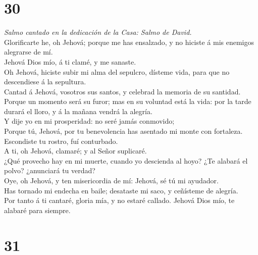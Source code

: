 \hypertarget{section-29}{%
\section{30}\label{section-29}}

 \emph{Salmo cantado en la dedicación de la Casa: Salmo de
David.}\\
Glorificarte he, oh Jehová; porque me has ensalzado, y no hiciste á mis
enemigos alegrarse de mí.\\
 Jehová Dios mío, á ti clamé, y me sanaste.\\
 Oh Jehová, hiciste subir mi alma del sepulcro, dísteme
vida, para que no descendiese á la sepultura.\\
 Cantad á Jehová, vosotros sus santos, y celebrad la memoria
de su santidad.\\
 Porque un momento será su furor; mas en su voluntad está la
vida: por la tarde durará el lloro, y á la mañana vendrá la alegría.\\
 Y dije yo en mi prosperidad: no seré jamás conmovido;\\
 Porque tú, Jehová, por tu benevolencia has asentado mi
monte con fortaleza. Escondiste tu rostro, fuí conturbado.\\
 A ti, oh Jehová, clamaré; y al Señor suplicaré.\\
 ¿Qué provecho hay en mi muerte, cuando yo descienda al
hoyo? ¿Te alabará el polvo? ¿anunciará tu verdad?\\
 Oye, oh Jehová, y ten misericordia de mí: Jehová, sé tú mi
ayudador.\\
 Has tornado mi endecha en baile; desataste mi saco, y
ceñísteme de alegría.\\
 Por tanto á ti cantaré, gloria mía, y no estaré callado.
Jehová Dios mío, te alabaré para siempre.

\hypertarget{section-30}{%
\section{31}\label{section-30}}

